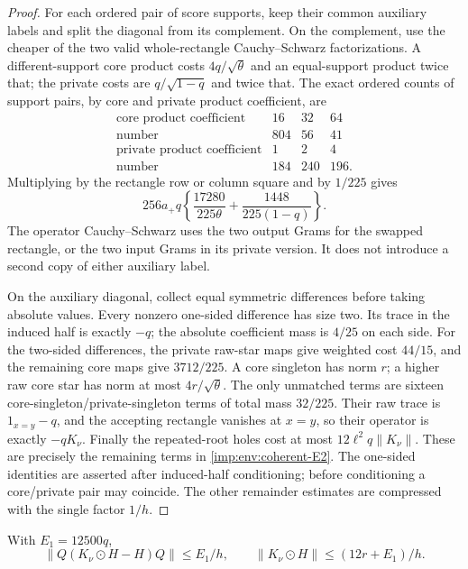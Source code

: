 \begin{proof}
For each ordered pair of score supports, keep their common auxiliary
labels and split the diagonal from its complement.  On the complement,
use the cheaper of the two valid whole-rectangle Cauchy--Schwarz
factorizations.  A different-support core product costs
$4q/\sqrt\theta$ and an equal-support product twice that; the
private costs are $q/\sqrt{1-q}$ and twice that.  The exact ordered counts of support pairs, by
core and private product coefficient, are
\[
 \begin{array}{c|rrr}
 \text{core product coefficient}&16&32&64\\
 \text{number}&804&56&41\\ \hline
 \text{private product coefficient}&1&2&4\\
 \text{number}&184&240&196.
 \end{array}
\]
Multiplying by the rectangle row or column square and by $1/225$
gives
\[
 256a_+q\left\{\frac{17280}{225\theta}
                  +\frac{1448}{225(1-q)}\right\}.
\]
The operator Cauchy--Schwarz uses the two output Grams for the
swapped rectangle, or the two input Grams in its private version.
It does not introduce a second copy of either auxiliary label.

On the auxiliary diagonal, collect equal symmetric differences before
taking absolute values.  Every nonzero one-sided difference has size
two.  Its trace in the induced half is exactly $-q$; the absolute
coefficient mass is $4/25$ on each side.  For the two-sided differences,
the private raw-star maps give weighted cost $44/15$, and the remaining
core maps give $3712/225$.  A core singleton has norm $r$; a higher
raw core star has norm at most $4r/\sqrt\theta$.  The only unmatched
terms are sixteen core-singleton/private-singleton terms of total
mass $32/225$.  Their raw trace is $1_{x=y}-q$, and the accepting
rectangle vanishes at $x=y$, so their operator is exactly $-qK_\nu$.
Finally the repeated-root holes cost at most
$12\ell^2q\|K_\nu\|$.
These are precisely the remaining terms in
\eqref{imp:env:coherent-E2}.
The one-sided identities are asserted after induced-half conditioning;
before conditioning a core/private pair may coincide.  The other
remainder estimates are compressed with the single factor $1/h$.
\end{proof}

\begin{lemma}
\label{imp:env:coherent-linear-finite}
With $E_1=12500q$,
\[
 \|Q(K_\nu\odot H-H)Q\|\le E_1/h,
 \qquad \|K_\nu\odot H\|\le(12r+E_1)/h.
\]
\end{lemma}

